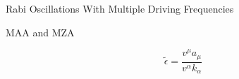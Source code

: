 \begin{frame}{Rabi Oscillations With Multiple Driving Frequencies}

\end{frame}






\begin{frame}{MAA and MZA}

\begin{equation*}
   \tilde \epsilon = \frac{ v^\mu a_\mu }{ v^\alpha k_\alpha }
\end{equation*}


\end{frame}


